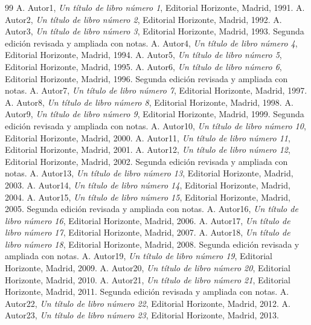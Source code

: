 \documentclass{article}
\begin{document}
\begin{thebibliography}{99}
 A. Autor1, \emph{Un título de libro número 1}, Editorial Horizonte, Madrid, 1991.
 A. Autor2, \emph{Un título de libro número 2}, Editorial Horizonte, Madrid, 1992.
 A. Autor3, \emph{Un título de libro número 3}, Editorial Horizonte, Madrid, 1993. Segunda edición revisada y ampliada con notas.
 A. Autor4, \emph{Un título de libro número 4}, Editorial Horizonte, Madrid, 1994.
 A. Autor5, \emph{Un título de libro número 5}, Editorial Horizonte, Madrid, 1995.
 A. Autor6, \emph{Un título de libro número 6}, Editorial Horizonte, Madrid, 1996. Segunda edición revisada y ampliada con notas.
 A. Autor7, \emph{Un título de libro número 7}, Editorial Horizonte, Madrid, 1997.
 A. Autor8, \emph{Un título de libro número 8}, Editorial Horizonte, Madrid, 1998.
 A. Autor9, \emph{Un título de libro número 9}, Editorial Horizonte, Madrid, 1999. Segunda edición revisada y ampliada con notas.
 A. Autor10, \emph{Un título de libro número 10}, Editorial Horizonte, Madrid, 2000.
 A. Autor11, \emph{Un título de libro número 11}, Editorial Horizonte, Madrid, 2001.
 A. Autor12, \emph{Un título de libro número 12}, Editorial Horizonte, Madrid, 2002. Segunda edición revisada y ampliada con notas.
 A. Autor13, \emph{Un título de libro número 13}, Editorial Horizonte, Madrid, 2003.
 A. Autor14, \emph{Un título de libro número 14}, Editorial Horizonte, Madrid, 2004.
 A. Autor15, \emph{Un título de libro número 15}, Editorial Horizonte, Madrid, 2005. Segunda edición revisada y ampliada con notas.
 A. Autor16, \emph{Un título de libro número 16}, Editorial Horizonte, Madrid, 2006.
 A. Autor17, \emph{Un título de libro número 17}, Editorial Horizonte, Madrid, 2007.
 A. Autor18, \emph{Un título de libro número 18}, Editorial Horizonte, Madrid, 2008. Segunda edición revisada y ampliada con notas.
 A. Autor19, \emph{Un título de libro número 19}, Editorial Horizonte, Madrid, 2009.
 A. Autor20, \emph{Un título de libro número 20}, Editorial Horizonte, Madrid, 2010.
 A. Autor21, \emph{Un título de libro número 21}, Editorial Horizonte, Madrid, 2011. Segunda edición revisada y ampliada con notas.
 A. Autor22, \emph{Un título de libro número 22}, Editorial Horizonte, Madrid, 2012.
 A. Autor23, \emph{Un título de libro número 23}, Editorial Horizonte, Madrid, 2013.

\end{thebibliography}
\end{document}
